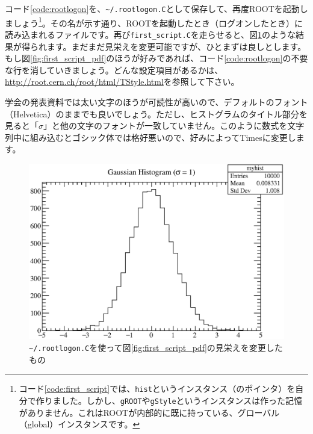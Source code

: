 {コード\ref{code:rootlogon}を、\texttt{\~{}/.rootlogon.C}として保存して、再度ROOTを起動しましょう\footnote{コード\ref{code:first_script}では、\texttt{hist}というインスタンス（のポインタ）を自分で作りました。しかし、\texttt{gROOT}や\texttt{gStyle}というインスタンスは作った記憶がありません。これはROOTが内部的に既に持っている、グローバル（global）インスタンスです。}。その名が示す通り、ROOTを起動したとき（ログオンしたとき）に読み込まれるファイルです。再び\texttt{first\_script.C}を走らせると、図\ref{fig:first_script_mod_eps}のような結果が得られます。まだまだ見栄えを変更可能ですが、ひとまずは良しとします。もし図\ref{fig:first_script_pdf}のほうが好みであれば、コード\ref{code:rootlogon}の不要な行を消していきましょう。どんな設定項目があるかは、\url{http://root.cern.ch/root/html/TStyle.html}を参照して下さい。

学会の発表資料では太い文字のほうが可読性が高いので、デフォルトのフォント（Helvetica）のままでも良いでしょう。ただし、ヒストグラムのタイトル部分を見ると「$\sigma$」と他の文字のフォントが一致していません。このように数式を文字列中に組み込むとゴシック体では格好悪いので、好みによってTimesに変更します。

\begin{NoFloat}

\end{NoFloat}
\pagebreak

\begin{figure}
  \centering
  \includegraphics[width=12cm,clip]{fig/first_script_mod.eps}
  \caption{\texttt{\~{}/.rootlogon.C}を使って図\ref{fig:first_script_pdf}の見栄えを変更したもの}
  \label{fig:first_script_mod_eps}
\end{figure}

}
